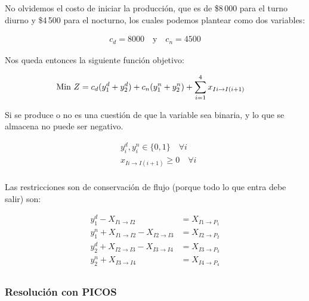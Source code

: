 \documentclass[12pt]{article}
\begin{document}
No olvidemos el costo de iniciar la producción, que es de \$8\,000 para el turno diurno y \$4\,500 para el nocturno, los cuales podemos plantear como dos variables:

\begin{align*}
    c_d = 8000 \quad \text{y} \quad c_n = 4500
\end{align*}

Nos queda entonces la siguiente función objetivo:

\begin{align*}
    \text{Min } & Z = c_d\*(y^d_1 + y^d_2) + c_n\*(y^n_1 + y^n_2) + \sum_{i=1}^{4} x_{Ii \to I(i+1)}
\end{align*}

Si se produce o no es una cuestión de que la variable sea binaria, y lo que se almacena no puede ser negativo.

\begin{align*}
    &y^d_i, y^n_i \in \{0,1\} \quad \forall i \\
    &x_{Ii \to I(i+1)} \ge 0 \quad \forall i \\
\end{align*}

Las restricciones son de conservación de flujo (porque todo lo que entra debe salir) son:

\begin{align*}
    y^d_1 - X_{I1 \to I2} &= X_{I1 \to P_1} \\
    y^n_1 + X_{I1 \to I2} - X_{I2 \to I3} &= X_{I2 \to P_2} \\
    y^d_2 + X_{I2 \to I3} - X_{I3 \to I4} &= X_{I3 \to P_3} \\
    y^n_2 + X_{I3 \to I4} &= X_{I4 \to P_4} \\
\end{align*}

\subsubsection{Resolución con PICOS}
\end{document}
